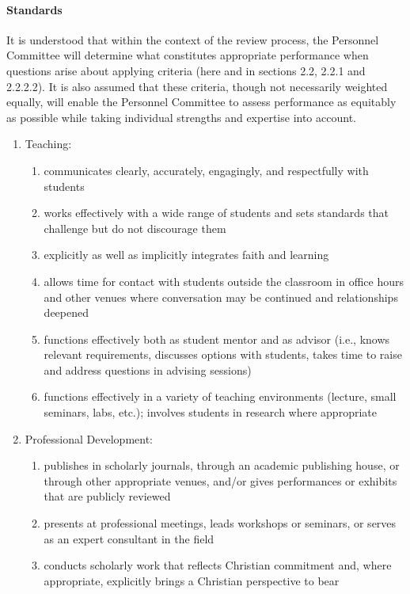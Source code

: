 \documentclass[letterpaper, 11pt]{article}
\begin{document}
			\paragraph{Standards}
				It is understood that within the context of the review process, the Personnel Committee will determine what constitutes appropriate performance when questions arise about applying criteria (here and in sections 2.2, 2.2.1 and 2.2.2.2).  It is also assumed that these criteria, though not necessarily weighted equally, will enable the Personnel Committee to assess performance as equitably as possible while taking individual strengths and expertise into account.
				\begin{enumerate}[label=\alph*)]
					\item{Teaching:
						\begin{enumerate}[label=\arabic*)]
							\item{communicates clearly, accurately, engagingly, and respectfully with students}
							\item{works effectively with a wide range of students and sets standards that challenge but do not discourage them}
							\item{explicitly as well as implicitly integrates faith and learning}
							\item{allows time for contact with students outside the classroom in office hours and other venues where conversation may be continued and relationships deepened}
							\item{functions effectively both as student mentor and as advisor (i.e., knows relevant requirements, discusses options with students, takes time to raise and address questions in advising sessions)}
							\item{functions effectively in a variety of teaching environments (lecture, small seminars, labs, etc.); involves students in research where appropriate}
						\end{enumerate}
					}
					\item{Professional Development:
						\begin{enumerate}[label=\arabic*)]
							\item{publishes in scholarly journals, through an academic publishing house, or through other appropriate venues, and/or gives performances or exhibits that are publicly reviewed}
							\item{presents at professional meetings, leads workshops or seminars, or serves as an expert consultant in the field}
							\item{conducts scholarly work that reflects Christian commitment and, where appropriate, explicitly brings a Christian perspective to bear}

\end{enumerate}}
\end{enumerate}
\end{document}
